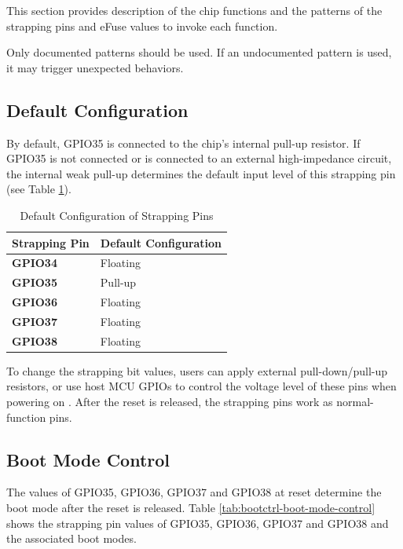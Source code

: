\documentclass[main\_\_EN.tex]{subfiles}
\begin{document}
This section provides description of the chip functions and the patterns of the strapping pins and eFuse values to invoke each function.

\begin{importantlisting}

Only documented patterns should be used. If an undocumented pattern is used, it may trigger unexpected behaviors.
\end{importantlisting}

\subsection{Default Configuration}
By default, GPIO35 is connected to the chip's internal pull-up resistor. If GPIO35 is not connected or is connected to an external high-impedance circuit, the internal weak pull-up determines the default input level of this strapping pin (see Table \ref{tab:bootctrl-default-config-strapping-pins}).

\newpage
\begin{longtable}[c]{|p{2.5cm}|p{3.5cm}|}
\caption{Default Configuration of Strapping Pins}
\label{tab:bootctrl-default-config-strapping-pins} \\
    \hline
    \rowcolor{lightgray}
  \textbf{Strapping Pin} & \textbf{Default Configuration} \\ \hline
  \textbf{GPIO34} & Floating \\ \hline
  \textbf{GPIO35} & Pull-up  \\ \hline
  \textbf{GPIO36} & Floating \\ \hline
  \textbf{GPIO37} & Floating  \\ \hline
  \textbf{GPIO38} & Floating \\ \hline
\end{longtable}

To change the strapping bit values, users can apply external pull-down/pull-up resistors, or use host MCU GPIOs to control the voltage level of these pins when powering on \chipname{}. After the reset is released, the strapping pins work as normal-function pins.

\subsection{Boot Mode Control}\label{sec:bootModeControl}

The values of GPIO35, GPIO36, GPIO37 and GPIO38 at reset determine the boot mode after the reset is released. Table \ref{tab:bootctrl-boot-mode-control} shows the strapping pin values of GPIO35, GPIO36, GPIO37 and GPIO38 and the associated boot modes.
\end{document}
